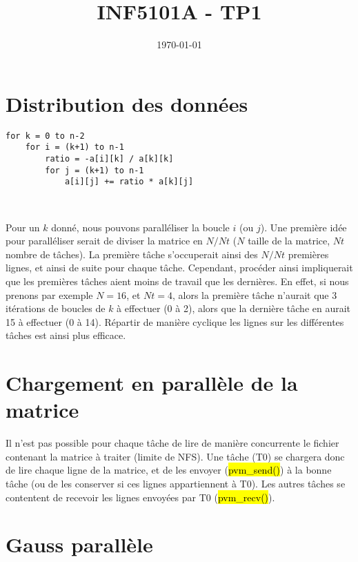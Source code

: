 \documentclass[a4paper,table]{article}
\title{INF5101A - TP1}
\date{\today}
\begin{document}
\maketitle
\newpage
\tableofcontents
\newpage

\section{Distribution des données}

\begin{lstlisting}
for k = 0 to n-2
	for i = (k+1) to n-1
		ratio = -a[i][k] / a[k][k]
		for j = (k+1) to n-1
			a[i][j] += ratio * a[k][j]
\end{lstlisting}
\

Pour un $k$ donné, nous pouvons paralléliser la boucle $i$ (ou $j$). Une première
idée pour paralléliser serait de diviser la matrice en $N/Nt$ ($N$ taille de la
matrice, $Nt$ nombre de tâches). La première tâche s'occuperait ainsi des $N/Nt$
premières lignes, et ainsi de suite pour chaque tâche. Cependant, procéder ainsi
impliquerait que les premières tâches aient moins de travail que les dernières.
En effet, si nous prenons par exemple $N = 16$, et $Nt = 4$, alors la première
tâche n'aurait que 3 itérations de boucles de $k$ à effectuer (0 à 2), alors que
la dernière tâche en aurait 15 à effectuer (0 à 14). Répartir de manière cyclique
les lignes sur les différentes tâches est ainsi plus efficace.

\newpage

\section{Chargement en parallèle de la matrice}

Il n'est pas possible pour chaque tâche de lire de manière concurrente le
fichier contenant la matrice à traiter (limite de NFS). Une tâche (T0) se chargera
donc de lire chaque ligne de la matrice, et de les envoyer (\hl{pvm\_send()}) à
la bonne tâche (ou de les conserver si ces lignes appartiennent à T0). Les
autres tâches se contentent de recevoir les lignes envoyées par T0
(\hl{pvm\_recv()}).\\




\newpage

\section{Gauss parallèle}
\end{document}
